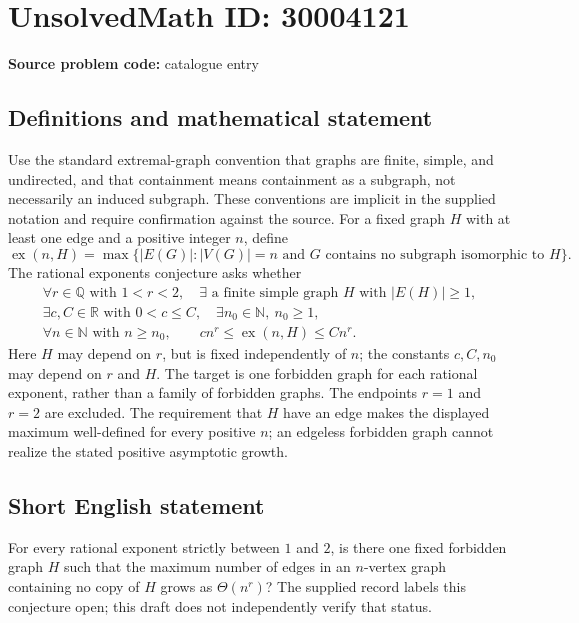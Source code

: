 \documentclass[11pt]{article}
\newcommand{\N}{\mathbb{N}}
\newcommand{\Q}{\mathbb{Q}}
\newcommand{\R}{\mathbb{R}}
\begin{document}
\section*{UnsolvedMath ID: 30004121}
\textbf{Source problem code:} catalogue entry
\subsection{Definitions and mathematical statement}
Use the standard extremal-graph convention that graphs are finite, simple, and undirected, and that containment means containment as a subgraph, not necessarily an induced subgraph. These conventions are implicit in the supplied notation and require confirmation against the source. For a fixed graph \(H\) with at least one edge and a positive integer \(n\), define
\[
\operatorname{ex}(n,H)=\max\bigl\{|E(G)|: |V(G)|=n\text{ and }G\text{ contains no subgraph isomorphic to }H\bigr\}.
\]
The rational exponents conjecture asks whether
\[
\begin{gathered}
\forall r\in\Q\text{ with }1<r<2,\quad
\exists\text{ a finite simple graph }H\text{ with }|E(H)|\geq 1,\\
\exists c,C\in\R\text{ with }0<c\leq C,\quad
\exists n_0\in\N,\ n_0\geq 1,\\
\forall n\in\N\text{ with }n\geq n_0,\qquad
c n^r\leq\operatorname{ex}(n,H)\leq C n^r.
\end{gathered}
\]
Here \(H\) may depend on \(r\), but is fixed independently of \(n\); the constants \(c,C,n_0\) may depend on \(r\) and \(H\). The target is one forbidden graph for each rational exponent, rather than a family of forbidden graphs. The endpoints \(r=1\) and \(r=2\) are excluded. The requirement that \(H\) have an edge makes the displayed maximum well-defined for every positive \(n\); an edgeless forbidden graph cannot realize the stated positive asymptotic growth.
\subsection{Short English statement}
For every rational exponent strictly between \(1\) and \(2\), is there one fixed forbidden graph \(H\) such that the maximum number of edges in an \(n\)-vertex graph containing no copy of \(H\) grows as \(\Theta(n^r)\)? The supplied record labels this conjecture open; this draft does not independently verify that status.
\end{document}

